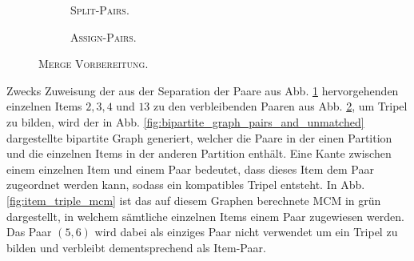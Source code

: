 \begin{figure}[H]
\centering
\begin{subfigure}[b]{\textwidth}
\centering
{}
\caption{\textsc{Split-Pairs}.}
\label{fig:split_pairs}
\end{subfigure}
\begin{subfigure}[b]{\textwidth}
\centering
{}
\caption{\textsc{Assign-Pairs}.}
\label{fig:assign_pairs}
\end{subfigure}
\caption{\textsc{Merge Vorbereitung}.}
\label{fig:pre_merge_step}
\end{figure}

Zwecks Zuweisung der aus der Separation der Paare aus Abb. \ref{fig:split_pairs} hervorgehenden einzelnen
Items $2, 3, 4$ und $13$ zu den verbleibenden Paaren aus Abb. \ref{fig:assign_pairs}, um Tripel zu bilden, wird der in Abb.
\ref{fig:bipartite_graph_pairs_and_unmatched} dargestellte bipartite Graph generiert, welcher die Paare in der einen Partition
und die einzelnen Items in der anderen Partition enthält. Eine Kante zwischen einem einzelnen Item und einem Paar bedeutet,
dass dieses Item dem Paar zugeordnet werden kann, sodass ein kompatibles Tripel entsteht.
In Abb. \ref{fig:item_triple_mcm} ist das auf diesem Graphen berechnete \textsc{MCM} in grün dargestellt, in welchem
sämtliche einzelnen Items einem Paar zugewiesen werden. Das Paar $(5, 6)$ wird dabei als einziges Paar nicht verwendet
um ein Tripel zu bilden und verbleibt dementsprechend als Item-Paar.

